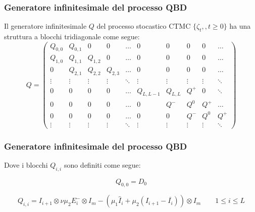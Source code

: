 \documentclass{beamer}
\begin{document}
\begin{frame}
    \frametitle{Generatore infinitesimale del processo QBD}
    \begin{theorem}
        Il generatore infinitesimale $Q$ del processo stocastico CTMC $\{\zeta_t,,t\geq 0\}$ ha una struttura a blocchi tridiagonale come segue:
        \small{\begin{equation*}
            Q =
            \begin{pmatrix}
                Q_{0,0} & Q_{0,1} & 0 & 0 & \dots & 0 & 0& 0 & 0 & \dots \\
                Q_{1,0} & Q_{1,1} & Q_{1,2} & 0 & \dots & 0 & 0 & 0 & 0 & \dots \\
                0 & Q_{2,1} & Q_{2,2} & Q_{2,3} & \dots & 0 & 0 & 0 & 0 & \dots \\
                \vdots & \vdots & \vdots & \vdots & \ddots & \vdots & \vdots & \vdots & \vdots & \ddots \\
                0 & 0 & 0 & 0 & \dots & Q_{L,L-1} & Q_{L,L} & Q^+& 0 & \ddots \\
                0 & 0 & 0 & 0 & \dots & 0 & Q^- & Q^0 & Q^+ & \dots \\
                0 & 0 & 0 & 0 & \dots & 0 & 0 & Q^- & Q^0 & Q^+ \\
                \vdots & \vdots & \vdots & \vdots & \ddots & \vdots & \vdots & \vdots & \vdots & \ddots
            \end{pmatrix}
        \end{equation*}}
    \end{theorem}
\end{frame}


\begin{frame}
    \frametitle{Generatore infinitesimale del processo QBD}
    Dove i blocchi $Q_{i,i}$ sono definiti come segue:
    \begin{block}{}
        $$Q_{0,0} = D_0$$
    \end{block}
    \begin{block}{}
        $$ Q_{i,i} = I_{i+1} \otimes \nu \mu_2 E_i^{-} \otimes I_m - (\mu_1 \widehat{I}_i + \mu_2 (I_{i+1} - \overline{I_i})) \otimes I_m \qquad 1 \leq i \leq L$$
    \end{block}
\end{frame}
\end{document}
